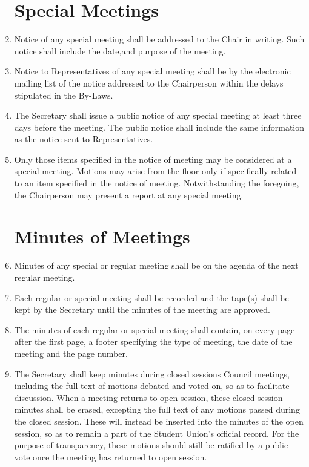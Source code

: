 \documentclass[oneside]{book}
\begin{document}
\begin{enumerate}
\section{\label{Special_Meetings}Special Meetings }
\item Notice of any special meeting shall be addressed to the Chair in writing.
Such notice shall include the date,and purpose of the meeting. 
\item Notice to Representatives of any special meeting shall be by the electronic
mailing list of the notice addressed to the Chairperson within the
delays stipulated in the By-Laws. 
\item The Secretary shall issue a public notice of any special meeting at
least three days before the meeting. The public notice shall include
the same information as the notice sent to Representatives. 
\item Only those items specified in the notice of meeting may be considered
at a special meeting. Motions may arise from the floor only if specifically
related to an item specified in the notice of meeting. Notwithstanding
the foregoing, the Chairperson may present a report at any special
meeting. 

\section{\label{Minutes_of_Meetings}Minutes of Meetings }
\item Minutes of any special or regular meeting shall be on the agenda of
the next regular meeting. 
\item Each regular or special meeting shall be recorded and the tape(s)
shall be kept by the Secretary until the minutes of the meeting are
approved. 
\item The minutes of each regular or special meeting shall contain, on every
page after the first page, a footer specifying the type of meeting,
the date of the meeting and the page number. 
\item The Secretary shall keep minutes during closed sessions Council meetings, including the full text of motions debated and voted on, so as to facilitate discussion. When a meeting returns to open session, these closed session minutes shall be erased, excepting the full text of any motions passed during the closed session. These will instead be inserted into the minutes of the open session, so as to remain a part of the Student Union’s official record. For the purpose of transparency, these motions should still be ratified by a public vote once the meeting has returned to open session.


\end{enumerate}
\end{document}
